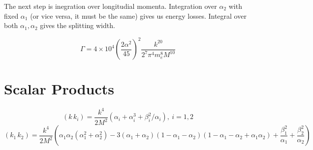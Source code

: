 \documentclass[12pt]{article}
\begin{document}
The next step is inegration over longitudial momenta. Integration over $\alpha_2$ with fixed $\alpha_1$ (or vice versa, it must be the same) gives us energy losses. Integral over both $\alpha_1,\alpha_2$ gives the splitting width.

\begin{equation}
\Gamma = 4\times{}10^4(\frac{2\alpha^2}{45})^2\frac{k^{20}}{2^7\pi^4m_e^8M^{10}}
\end{equation} 



\section{Scalar Products}
\begin{equation}
    (k\, k_i)= \frac{k^4}{2M^2}\left( \alpha_i + \alpha_i^3 + \beta^2_i/\alpha_i \right), \ i=1,2
\end{equation}
\begin{equation}
    (k_1\, k_2)= \frac{k^4}{2M^2}\left( \alpha_1\alpha_2(\alpha_1^2+\alpha_2^2) - 3(\alpha_1+\alpha_2)(1-\alpha_1-\alpha_2)(1-\alpha_1-\alpha_2 + \alpha_1\alpha_2) +\frac{\beta_1^2}{\alpha_1} + \frac{\beta_2^2}{\alpha_2} \right)
\end{equation}
\end{document}
